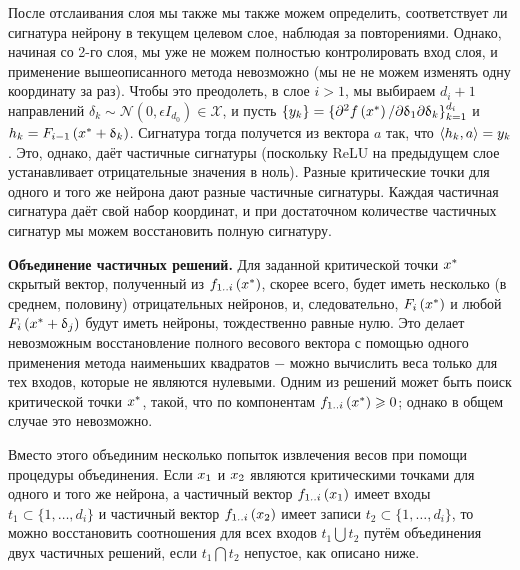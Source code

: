 После отслаивания слоя мы также мы также можем определить, соответствует ли сигнатура нейрону в текущем целевом слое, наблюдая за повторениями. Однако, начиная со 2-го слоя, мы уже не можем полностью контролировать вход слоя, и применение вышеописанного метода невозможно (мы не не можем изменять одну координату за раз). Чтобы это преодолеть, в слое $i > 1$, мы выбираем $d_{i} + 1$ направлений $\delta_{k} \sim \mathcal{N} \left(0, \epsilon I_{d_{0}}\right) \in \mathcal{X}$, и пусть $\{y_{k}\} = \{ \partial^{2}\mathnormal{f}\left(\mathnormal{x}^{*}\right) / {\partial \delta_{1} \partial \delta_{k}} \}_{k=1}^{d_{i}}$ и $\mathnormal{h}_{k} = \mathnormal{F}_{i-1}\left(\mathnormal{x}^{*}+\delta_{k}\right)$. Сигнатура тогда получется из вектора $a$ так, что $\left \langle h_{k}, a \right \rangle = \mathnormal{y}_{k}$. Это, однако, даёт частичные сигнатуры (поскольку ReLU на предыдущем слое устанавливает отрицательные значения в ноль). Разные критические точки для одного и того же нейрона дают разные частичные сигнатуры. Каждая частичная сигнатура даёт свой набор координат, и при достаточном количестве частичных сигнатур мы можем восстановить полную сигнатуру.

\textbf{Объединение частичных решений.} Для заданной критической точки $\mathnormal{x}^{*}$ скрытый вектор, полученный из $\mathnormal{f}_{1..i}\left(\mathnormal{x}^{*}\right)$, скорее всего, будет иметь несколько (в среднем, половину) отрицательных нейронов, и, следовательно, $\mathnormal{F}_{i} \left(\mathnormal{x}^{*}\right)$ и любой $\mathnormal{F}_{i} \left(\mathnormal{x}^{*} + \delta_{j}\right)$ будут иметь нейроны, тождественно равные нулю. Это делает невозможным восстановление полного весового вектора с помощью одного применения метода наименьших квадратов $-$ можно вычислить веса только для тех входов, которые не являются нулевыми. Одним из решений может быть поиск критической точки $\mathnormal{x}^{*}$, такой, что по компонентам  $\mathnormal{f}_{1..i}\left(\mathnormal{x}^{*}\right) \ge 0$; однако в общем случае это невозможно.

Вместо этого объединим несколько попыток извлечения весов при помощи процедуры объединения. Если $\mathnormal{x}_{1}$ и $\mathnormal{x}_{2}$ являются критическими точками для одного и того же нейрона, а частичный вектор  $\mathnormal{f}_{1..i}\left(\mathnormal{x}_{1}\right)$ имеет входы $t_{1} \subset \{1, \dots, d_{i}\}$ и частичный вектор $\mathnormal{f}_{1..i}\left(\mathnormal{x}_{2}\right)$ имеет записи $t_{2} \subset \{1, \dots, d_{i}\}$, то можно восстановить соотношения для всех входов $t_{1} \bigcup t_{2}$ путём объединения двух частичных решений, если $t_{1} \bigcap t_{2}$ непустое, как описано ниже.

